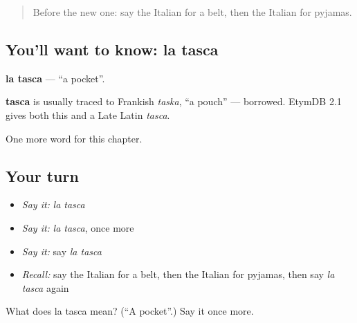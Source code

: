 \label{lesson:IT-C220-tasca}



\begin{quote}
Before the new one: say the Italian for a belt, then the Italian for pyjamas.
\end{quote}

\subsection*{You'll want to know: la tasca}
\textbf{la tasca} — \textquotedblleft{}a pocket\textquotedblright{}.

\begin{cousinweb}
\textbf{tasca} is usually traced to Frankish \emph{taska}, \textquotedblleft{}a pouch\textquotedblright{} — borrowed. EtymDB 2.1 gives both this and a Late Latin \emph{tasca}.
\end{cousinweb}

\begin{grammarlens}[title={What you've built}]
One more word for this chapter.
\end{grammarlens}

\subsection*{Your turn}
\begin{itemize}
\raggedright
  \item \emph{Say it:} \emph{la tasca}
  \item \emph{Say it:} \emph{la tasca}, once more
  \item \emph{Say it:} say \emph{la tasca}
  \item \emph{Recall:} say the Italian for a belt, then the Italian for pyjamas, then say \emph{la tasca} again
\end{itemize}

\begin{tcolorbox}[breakable,colback=teal!4,colframe=teal!35!black,title={Before you move on}]
What does la tasca mean? (\textquotedblleft{}A pocket\textquotedblright{}.) Say it once more.
\end{tcolorbox}
